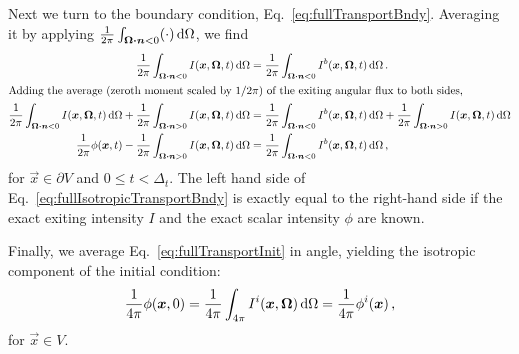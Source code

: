 Next we turn to the boundary condition, Eq.~\eqref{eq:fullTransportBndy}.
Averaging it by applying $\frac{1}{2\pi} \int_{\bm{\Omega} \bm{\cdot} \bm{n} < 0}
(\cdot) \mathop{}\!\mathrm{d} \Omega$, we find
\begin{align} \nonumber
 \frac{1}{2\pi} \int_{\vec{\Omega} \vd \vec{n} < 0} I(\vec{x}, \vec{\Omega},
 t) \ud \Omega
 &= \frac{1}{2\pi} \int_{\vec{\Omega} \vd \vec{n} < 0}I^b(\vec{x},
 \vec{\Omega}, t) \ud \Omega\,.
\\ \intertext{Adding the average (zeroth moment scaled by $1/2\pi$) of the exiting
angular flux to both sides,} \nonumber
 \frac{1}{2\pi} \int_{\vec{\Omega} \vd \vec{n} < 0}
 I(\vec{x}, \vec{\Omega}, t) \ud \Omega
 + \frac{1}{2\pi} \int_{\vec{\Omega} \vd \vec{n} > 0}
 I(\vec{x}, \vec{\Omega}, t) \ud \Omega
 &= \frac{1}{2\pi} \int_{\vec{\Omega} \vd \vec{n} < 0}
 I^b(\vec{x}, \vec{\Omega}, t) \ud \Omega
 + \frac{1}{2\pi} \int_{\vec{\Omega} \vd \vec{n} > 0}
 I(\vec{x}, \vec{\Omega}, t) \ud \Omega
\\ 
\label{eq:fullIsotropicTransportBndy}
 \frac{1}{2\pi} \phi(\vec{x}, t)
 - \frac{1}{2\pi} \int_{\vec{\Omega} \vd \vec{n} > 0}
 I(\vec{x}, \vec{\Omega}, t) \ud \Omega
 &= \frac{1}{2\pi} \int_{\vec{\Omega} \vd \vec{n} < 0}
 I^b(\vec{x}, \vec{\Omega}, t) \ud \Omega
 \,,
\end{align}
for $\vec{x} \in \partial V$ and $0 \le t < \Delta_t$. The left hand side of
Eq.~\eqref{eq:fullIsotropicTransportBndy} is exactly equal to the right-hand
side if the exact exiting intensity $I$ and the exact scalar
intensity $\phi$ are known.

Finally, we average Eq.~\eqref{eq:fullTransportInit} in angle, yielding the
isotropic component of the initial condition:
\begin{equation} \label{eq:fullIsotropicTransportInit}
\frac1{4\pi} \phi(\bm{x}, 0) = \frac1{4\pi} \int_{4\pi}  I^i(\bm{x},
\bm{\Omega}) \mathop{}\!\mathrm{d} \Omega = \frac1{4\pi} \phi^i(\bm{x}) \,,
\end{equation}
for $\vec{x} \in V$. 

